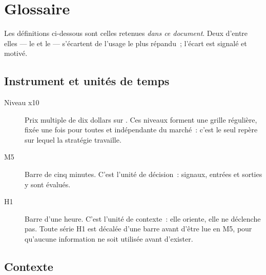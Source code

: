 \section{Glossaire}
\label{app:x10_glossaire}


Les définitions ci-dessous sont celles retenues \emph{dans ce document}. Deux
d'entre elles --- le  et le  --- s'écartent de l'usage le
plus répandu~; l'écart est signalé et motivé.

\subsection{Instrument et unités de temps}

\begin{description}
  \item[Niveau x10] Prix multiple de dix dollars sur . Ces
  niveaux forment une grille régulière, fixée une fois pour toutes et
  indépendante du marché~: c'est le seul repère sur lequel la stratégie
  travaille.
  \item[M5] Barre de cinq minutes. C'est l'unité de décision~: signaux,
  entrées et sorties y sont évalués.
  \item[H1] Barre d'une heure. C'est l'unité de contexte~: elle oriente, elle
  ne déclenche pas. Toute série H1 est décalée d'une barre avant d'être lue en
  M5, pour qu'aucune information ne soit utilisée avant d'exister.
\end{description}

\subsection{Contexte}

